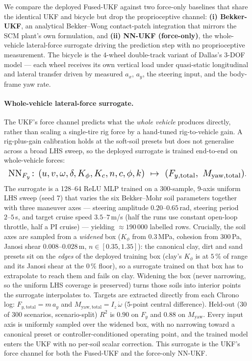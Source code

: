 \documentclass[conference,letterpaper,10pt]{IEEEtran}
\begin{document}
We compare the deployed Fused-UKF against two force-only baselines that
share the identical UKF and bicycle but drop the proprioceptive
channel: \textbf{(i) Bekker-UKF}, an analytical Bekker--Wong
contact-patch integration that mirrors the SCM plant's own formulation,
and \textbf{(ii) NN-UKF (force-only)}, the whole-vehicle lateral-force
surrogate driving the prediction step with no proprioceptive
measurement. The bicycle is the 4-wheel double-track variant of
Dallas's 3-DOF model --- each wheel receives its own vertical load
under quasi-static longitudinal and lateral transfer driven by measured
$a_x$, $a_y$, the steering input, and the body-frame yaw rate.

\paragraph{Whole-vehicle lateral-force surrogate.} The UKF's force
channel predicts what the \emph{whole vehicle} produces directly, rather
than scaling a single-tire rig force by a hand-tuned rig-to-vehicle gain.
A rig-plus-gain calibration holds at the soft-soil presets but does not
generalise across a broad LHS sweep, so the deployed surrogate is trained
end-to-end on whole-vehicle forces:
\[
  \resizebox{\columnwidth}{!}{$\displaystyle
  \mathrm{NN}_{F_y}\!:\, (u, v, \omega, \delta, K_\phi, K_c, n,
  c, \phi, k)\ \mapsto\ (F_{y,\mathrm{total}},\ M_{\mathrm{yaw,total}})$}.
\]
The surrogate is a 128--64 ReLU MLP trained on a 300-sample,
9-axis uniform LHS sweep
(seed 7)
that varies the six Bekker--Mohr soil parameters together with three
maneuver axes --- steering amplitude $0.20\text{--}0.65\,$rad,
steering period $2\text{--}5\,$s, and target cruise speed
$3.5\text{--}7\,$m/s (half the runs use constant open-loop throttle,
half a PI cruise) --- yielding $\approx 190\,000$ labelled rows.
Crucially, the soil axes are sampled from a \emph{widened} box
($K_\phi$ from $0.3\,$MPa, cohesion from $300\,$Pa, Janosi shear
$0.008\text{--}0.028\,$m, $n\in[0.35,1.35]$): the canonical clay,
dirt and sand presets sit on the \emph{edges} of the deployed
training box (clay's $K_\phi$ is at $5\,\%$ of
range and its Janosi shear at the $0\,\%$ floor), so a surrogate
trained on that box has to extrapolate to reach them and fails on
clay. Widening the box (never narrowing, so the uniform LHS coverage
is preserved) turns those soils into interior points the surrogate
interpolates to.
Targets are extracted directly from each Chrono log:
$F_{y,\mathrm{total}}\!=\!m\,a_y$ and
$M_{\mathrm{yaw,total}}\!=\!I_z\,\dot\omega$ (5-point central
difference). Held-out (30 of 300 scenarios, scenario-split) $R^2$ is
$0.90$ on $F_y$ and $0.88$ on $M_{\mathrm{yaw}}$. Every input axis is
uniformly sampled over the widened box, with no narrowing toward a
canonical preset or controller-conditioned operating point, and the
trained model enters the UKF with no per-soil scalar correction. This
surrogate is the UKF's force channel for both the Fused-UKF and the
force-only NN-UKF.
\end{document}
